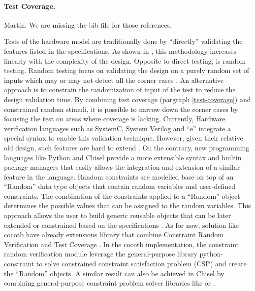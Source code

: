 \documentclass[conference]{IEEEtran}
\newcommand{\martin}[1]{{\color{blue} Martin: #1}}
\begin{document}
\paragraph{Test Coverage.}

\martin{We are missing the bib file for those references.}

Tests of the hardware model are traditionally done by ``directly'' validating the features listed in the specifications. As shown in \cite{spear2008systemverilog}, this methodology increases linearly with the complexity of the design. Opposite to direct testing, is random testing. Random testing focus on validating the design on a purely random set of inputs which may or may not detect all the corner cases \cite{mehta2017a}. An alternative approach is to constrain the randomization of input of the test to reduce the design validation time. By combining test coverage (pargraph \ref{test-coverage}) and constrained random stimuli, it is possible to narrow down the corner cases by focusing the test on areas where coverage is lacking. Currently, Hardware verification languages such as SystemC, System Verilog and ``e'' integrate a special syntax to enable this validation technique. However, given their relative old design, such features are hard to extend \cite{haedicke2012crave} \cite{le2015boosting}. On the contrary, new programming languages like Python and Chisel provide a more extensible syntax and builtin package managers that easily allows the integration and extension of a similar feature in the language. Random constraints are modelled base on top of an ``Random'' data type objects that contain random variables and user-defined constraints.  The combination of the constraints applied to a ``Random'' object determines the possible values that can be assigned to the random variables. This approach allows the user to build generic reusable objects that can be later extended or constrained based on the specifications \cite{cieplucha2016new}\cite{mehta2017a}. As for now, solution like cocotb \cite{rosser2018cocotb}\cite{cocotb2020Sep} have already extensions library that combine Constraint Random Verification and Test Coverage \cite{mciepluc2020Sep}. In the cocotb implementation, the constraint random verification module leverage the general-purpose library python-constraint \cite{python-constraint2020Sep} to solve constrained constraint satisfaction problem (CSP) and create the ``Random'' objects. A similar result can also be achieved in Chisel by combining general-purpose constraint problem solver libraries like \cite{chocoteam2020Sep} or \cite{BibEntry2020Sep}.
\end{document}

